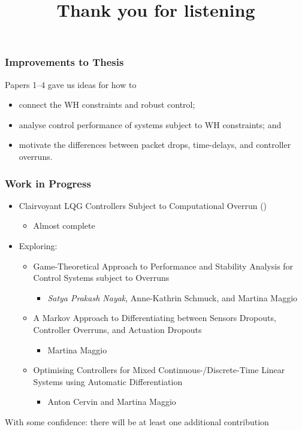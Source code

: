\begin{frame}
    \frametitle{Improvements to Thesis}
    Papers 1--4 gave us ideas for how to
    \begin{itemize}
        \item connect the WH constraints and robust control;
        \item analyse control performance of systems subject to WH constraints; and
        \item motivate the differences between packet drops, time-delays, and controller overruns. 
    \end{itemize}
\end{frame}

\begin{frame}
    \frametitle{Work in Progress}
    \begin{itemize}
        \item Clairvoyant LQG Controllers Subject to Computational Overrun ()
            \begin{itemize}
                \item Almost complete
            \end{itemize}
        \item Exploring:
            \begin{itemize}
                \item Game-Theoretical Approach to Performance and Stability Analysis for Control Systems subject to Overruns
                    \begin{itemize}
                        \item \emph{Satya Prakash Nayak}, Anne-Kathrin Schmuck, and Martina Maggio
                    \end{itemize}
                \item A Markov Approach to Differentiating between Sensors Dropouts, Controller Overruns, and Actuation Dropouts
                    \begin{itemize}
                        \item Martina Maggio
                    \end{itemize}
                \item Optimising Controllers for Mixed Continuous-/Discrete-Time Linear Systems using Automatic Differentiation
                    \begin{itemize}
                        \item Anton Cervin and Martina Maggio
                    \end{itemize}
            \end{itemize}
    \end{itemize}
    With some confidence: there will be at least one additional contribution
\end{frame}

\title[Preperatory Seminar]{%
    {\Huge Thank you for listening}
}
\author[Nils Vreman]{}
\date[]{}
\notitlelogo{}
